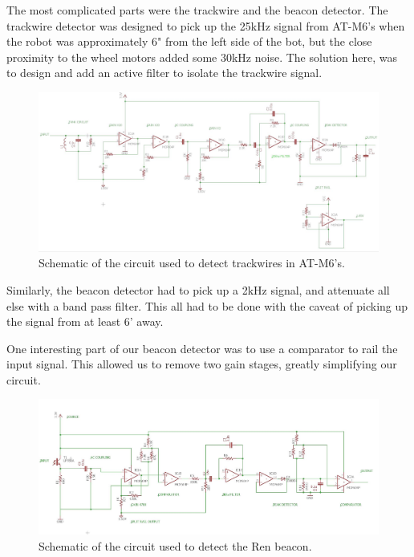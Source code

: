 \documentclass[]{article}
\begin{document}
The most complicated parts were the trackwire and the beacon detector. The trackwire detector was designed to pick up the 25kHz signal from AT-M6's when the robot was approximately 6" from the left side of the bot, but the close proximity to the wheel motors added some 30kHz noise. The solution here, was to design and add an active filter to isolate the trackwire signal.

\begin{figure}[H]
    \centering
    \includegraphics[scale=0.40]{TANK-CIRCUIT.JPG}
    \caption{Schematic of the circuit used to detect trackwires in AT-M6's.}
    \label{Trackwire circuit}
\end{figure}


Similarly, the beacon detector had to pick up a 2kHz signal, and attenuate all else with a band pass filter. This all had to be done with the caveat of picking up the signal from at least 6' away.

One interesting part of our beacon detector was to use a comparator to rail the input signal. This allowed us to remove two gain stages, greatly simplifying our circuit.

\begin{figure}[H]
    \centering
    \includegraphics[scale=0.40]{BEACON_DETECTOR.JPG}
    \caption{Schematic of the circuit used to detect the Ren beacon.}
    \label{beacon detector}
\end{figure}
\end{document}
